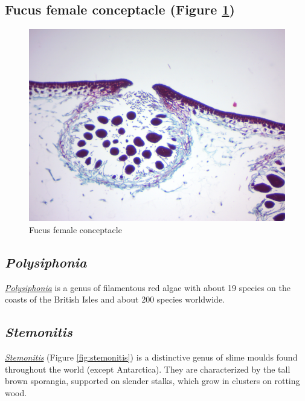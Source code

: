 \subsection{Fucus female conceptacle (Figure
\ref{fig:femalefucus})}\label{fucus-female-conceptacle-figure-reffigfemalefucus}

\begin{figure}

{\centering \includegraphics[width=0.7\linewidth]{./figures/protists/female_fucus}

}

\caption{Fucus female conceptacle}\label{fig:femalefucus}
\end{figure}

\subsection{\texorpdfstring{\emph{Polysiphonia}}{Polysiphonia}}\label{polysiphonia}

\href{https://en.wikipedia.org/wiki/Polysiphonia}{\emph{Polysiphonia}}
is a genus of filamentous red algae with about 19 species on the coasts
of the British Isles and about 200 species worldwide.

\subsection{\texorpdfstring{\emph{Stemonitis}}{Stemonitis}}\label{stemonitis}

\href{https://en.wikipedia.org/wiki/Stemonitis}{\emph{Stemonitis}}
(Figure \ref{fig:stemonitis}) is a distinctive genus of slime moulds
found throughout the world (except Antarctica). They are characterized
by the tall brown sporangia, supported on slender stalks, which grow in
clusters on rotting wood.

